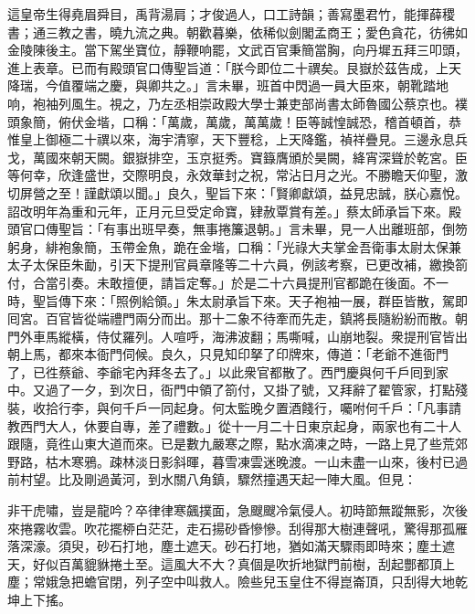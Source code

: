 這皇帝生得堯眉舜目，禹背湯肩；才俊過人，口工詩韻；善寫墨君竹，能揮薛稷書；通三教之書，曉九流之典。朝歡暮樂，依稀似劍閣孟商王；愛色貪花，彷彿如金陵陳後主。{}當下駕坐寶位，靜鞭响罷，文武百官秉簡當胸，向丹墀五拜三叩頭，進上表章。已而有殿頭官口傳聖旨道：「朕今即位二十禩矣。艮嶽於茲告成，上天降瑞，今值覆端之慶，與卿共之。」言未畢，班首中閃過一員大臣來，朝靴踏地响，袍袖列風生。視之，乃左丞相崇政殿大學士兼吏部尚書太師魯國公蔡京也。襆頭象簡，俯伏金堦，口稱：「萬歲，萬歲，萬萬歲！臣等誠惶誠恐，稽首頓首，恭惟皇上御極二十禩以來，海宇清寧，天下豐稔，上天降鑑，禎祥疊見。三邊永息兵戈，萬國來朝天闕。銀嶽排空，玉京挺秀。寶籙膺頒於昊闕，絳宵深聳於乾宮。{}臣等何幸，欣逢盛世，交際明良，永效華封之祝，常沾日月之光。不勝瞻天仰聖，激切屏營之至！謹獻頌以聞。」{}良久，聖旨下來：「賢卿獻頌，益見忠誠，朕心嘉悅。詔改明年為重和元年，正月元旦受定命寶，肄赦覃賞有差。」蔡太師承旨下來。殿頭官口傳聖旨：「有事出班早奏，無事捲簾退朝。」言未畢，見一人出離班部，倒笏躬身，緋袍象簡，玉帶金魚，跪在金堦，口稱：「光祿大夫掌金吾衛事太尉太保兼太子太保臣朱勔，引天下提刑官員章隆等二十六員，例該考察，已更改補，繳換箚付，合當引奏。未敢擅便，請旨定奪。」於是二十六員提刑官都跪在後面。不一時，聖旨傳下來：「照例給領。」朱太尉承旨下來。天子袍袖一展，群臣皆散，駕即囘宮。百官皆從端禮門兩分而出。那十二象不待牽而先走，鎮將長隨紛紛而散。朝門外車馬縱橫，侍仗羅列。人喧呼，海沸波翻；馬嘶喊，山崩地裂。衆提刑官皆出朝上馬，都來本衙門伺候。良久，只見知印拏了印牌來，傳道：「老爺不進衙門了，已徃蔡爺、李爺宅內拜冬去了。」以此衆官都散了。西門慶與何千戶囘到家中。又過了一夕，到次日，衙門中領了箚付，又掛了號，又拜辭了翟管家，打點殘裝，收拾行李，與何千戶一同起身。何太監晚夕置酒餞行，囑咐何千戶：「凡事請教西門大人，休要自專，差了禮數。」從十一月二十日東京起身，兩家也有二十人跟隨，竟徃山東大道而來。已是數九嚴寒之際，點水滴凍之時，一路上見了些荒郊野路，枯木寒鴉。疎林淡日影斜暉，暮雪凍雲迷晚渡。一山未盡一山來，後村已過前村望。比及剛過黃河，到水關八角鎮，驟然撞遇天起一陣大風。{}但見：

\begin{myquote}
非干虎嘯，豈是龍吟？卒律律寒飆撲面，急颼颼冷氣侵人。初時節無蹤無影，次後來捲霧收雲。吹花擺桺白茫茫，走石揚砂昏慘慘。刮得那大樹連聲吼，驚得那孤雁落深濠。須臾，砂石打地，塵土遮天。砂石打地，猶如滿天驟雨即時來；塵土遮天，好似百萬貔貅捲土至。這風大不大？真個是吹折地獄門前樹，刮起酆都頂上塵；常娥急把蟾官閉，列子空中叫救人。險些兒玉皇住不得崑崙頂，只刮得大地乾坤上下搖。
\end{myquote}

